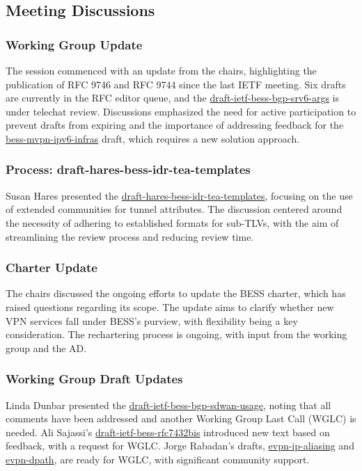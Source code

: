 \documentclass{article}
\begin{document}
\subsection{Meeting Discussions}

\subsubsection{Working Group Update}
The session commenced with an update from the chairs, highlighting the publication of RFC 9746 and RFC 9744 since the last IETF meeting. Six drafts are currently in the RFC editor queue, and the \href{https://datatracker.ietf.org/doc/html/draft-ietf-bess-bgp-srv6-args}{draft-ietf-bess-bgp-srv6-args} is under telechat review. Discussions emphasized the need for active participation to prevent drafts from expiring and the importance of addressing feedback for the \href{https://datatracker.ietf.org/doc/html/draft-ietf-bess-mvpn-ipv6-infras}{bess-mvpn-ipv6-infras} draft, which requires a new solution approach.

\subsubsection{Process: draft-hares-bess-idr-tea-templates}
Susan Hares presented the \href{https://datatracker.ietf.org/doc/html/draft-hares-bess-idr-tea-templates}{draft-hares-bess-idr-tea-templates}, focusing on the use of extended communities for tunnel attributes. The discussion centered around the necessity of adhering to established formats for sub-TLVs, with the aim of streamlining the review process and reducing review time.

\subsubsection{Charter Update}
The chairs discussed the ongoing efforts to update the BESS charter, which has raised questions regarding its scope. The update aims to clarify whether new VPN services fall under BESS's purview, with flexibility being a key consideration. The rechartering process is ongoing, with input from the working group and the AD.

\subsubsection{Working Group Draft Updates}
Linda Dunbar presented the \href{https://datatracker.ietf.org/doc/html/draft-ietf-bess-bgp-sdwan-usage}{draft-ietf-bess-bgp-sdwan-usage}, noting that all comments have been addressed and another Working Group Last Call (WGLC) is needed. Ali Sajassi's \href{https://datatracker.ietf.org/doc/html/draft-ietf-bess-rfc7432bis}{draft-ietf-bess-rfc7432bis} introduced new text based on feedback, with a request for WGLC. Jorge Rabadan's drafts, \href{https://datatracker.ietf.org/doc/html/draft-ietf-bess-evpn-ip-aliasing}{evpn-ip-aliasing} and \href{https://datatracker.ietf.org/doc/html/draft-ietf-bess-evpn-dpath}{evpn-dpath}, are ready for WGLC, with significant community support.
\end{document}
